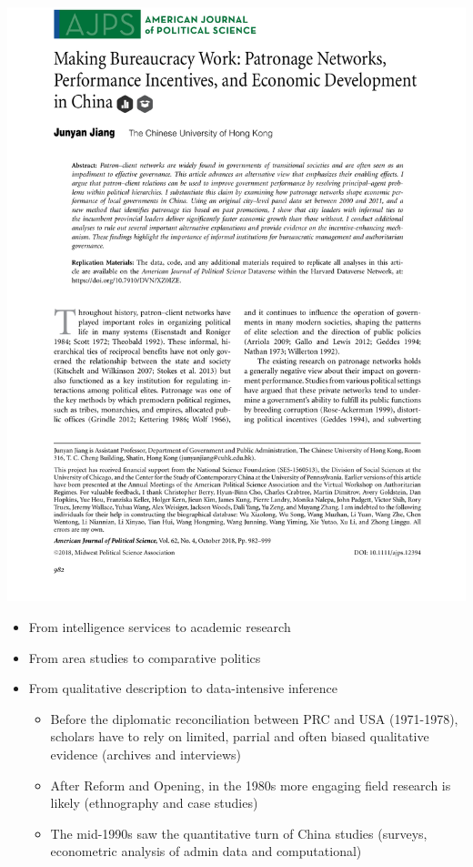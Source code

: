 \documentclass[
  10pt,
  ignorenonframetext,
]{beamer}
\begin{document}
\begin{frame}
\begin{center}\includegraphics[width=0.95\linewidth]{Figs/jiang} \end{center}
\end{frame}

\begin{frame}
\begin{itemize}
  \item From intelligence services to academic research
  \vspace{0.3cm}
  \item From area studies to comparative politics
  \vspace{0.3cm}
  \item From qualitative description to data-intensive inference
  \vspace{0.1cm}
  \begin{itemize}
    \item Before the diplomatic reconciliation between PRC and USA (1971-1978), scholars have to rely on limited, parrial and often biased qualitative evidence (archives and interviews)
    \item After Reform and Opening, in the 1980s more engaging field research is likely (ethnography and case studies)
    \item The mid-1990s saw the quantitative turn of China studies (surveys, econometric analysis of admin data and computational)
  \end{itemize}
\end{itemize}
\end{frame}
\end{document}
